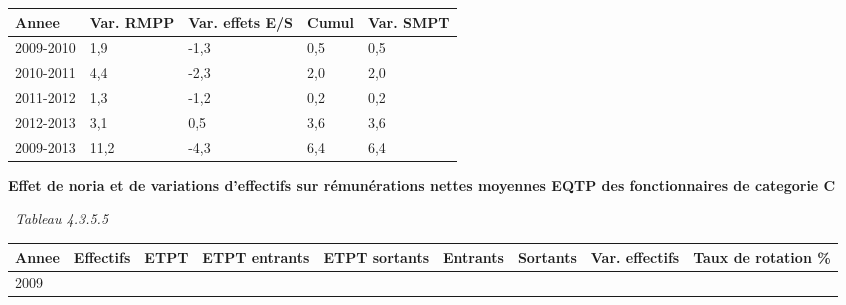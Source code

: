 \begin{longtable}[]{@{}lllll@{}}
\toprule
Annee & Var. RMPP & Var. effets E/S & Cumul & Var. SMPT\tabularnewline
\midrule
\endhead
2009-2010 & 1,9 & -1,3 & 0,5 & 0,5\tabularnewline
2010-2011 & 4,4 & -2,3 & 2,0 & 2,0\tabularnewline
2011-2012 & 1,3 & -1,2 & 0,2 & 0,2\tabularnewline
2012-2013 & 3,1 & 0,5 & 3,6 & 3,6\tabularnewline
2009-2013 & 11,2 & -4,3 & 6,4 & 6,4\tabularnewline
\bottomrule
\end{longtable}

\textbf{Effet de noria et de variations d'effectifs sur rémunérations
nettes moyennes EQTP des fonctionnaires de categorie C}

~\emph{Tableau 4.3.5.5}

\begin{longtable}[]{@{}lllllllll@{}}
\toprule
\begin{minipage}[b]{0.05\columnwidth}\raggedright
Annee\strut
\end{minipage} & \begin{minipage}[b]{0.08\columnwidth}\raggedright
Effectifs\strut
\end{minipage} & \begin{minipage}[b]{0.05\columnwidth}\raggedright
ETPT\strut
\end{minipage} & \begin{minipage}[b]{0.10\columnwidth}\raggedright
ETPT entrants\strut
\end{minipage} & \begin{minipage}[b]{0.10\columnwidth}\raggedright
ETPT sortants\strut
\end{minipage} & \begin{minipage}[b]{0.07\columnwidth}\raggedright
Entrants\strut
\end{minipage} & \begin{minipage}[b]{0.07\columnwidth}\raggedright
Sortants\strut
\end{minipage} & \begin{minipage}[b]{0.11\columnwidth}\raggedright
Var. effectifs\strut
\end{minipage} & \begin{minipage}[b]{0.14\columnwidth}\raggedright
Taux de rotation \%\strut
\end{minipage}\tabularnewline
\midrule
\endhead
\begin{minipage}[t]{0.05\columnwidth}\raggedright
2009\strut
\end{minipage} & \begin{minipage}[t]{0.08\columnwidth}\raggedright

\end{minipage}
\end{longtable}
